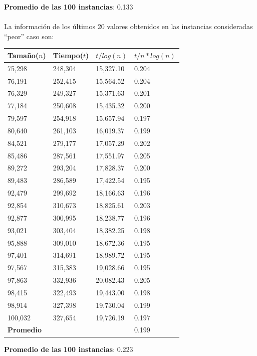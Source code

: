 \textbf{Promedio de las 100 instancias}: 0.133
\\
\\
La información de los últimos 20 valores obtenidos en las instancias consideradas ``peor'' caso son:

\begin{table}[H]
\parbox{0.3\textwidth}{
    \begin{tabular}{ | l | l |l | l |}
    \hline
	Tamaño($n$) & Tiempo($t$) & \textbf{$t / log(n)$} & \textbf{$t / n*log(n)$} \\ \hline
75,298	&	248,304	&	15,327.10	&	0.204	\\ \hline
76,191	&	252,415	&	15,564.52	&	0.204	\\ \hline
76,329	&	249,327	&	15,371.63	&	0.201	\\ \hline
77,184	&	250,608	&	15,435.32	&	0.200	\\ \hline
79,597	&	254,918	&	15,657.94	&	0.197	\\ \hline
80,640	&	261,103	&	16,019.37	&	0.199	\\ \hline
84,521	&	279,177	&	17,057.29	&	0.202	\\ \hline
85,486	&	287,561	&	17,551.97	&	0.205	\\ \hline
89,272	&	293,204	&	17,828.37	&	0.200	\\ \hline
89,483	&	286,589	&	17,422.54	&	0.195	\\ \hline
92,479	&	299,692	&	18,166.63	&	0.196	\\ \hline
92,854	&	310,673	&	18,825.61	&	0.203	\\ \hline
92,877	&	300,995	&	18,238.77	&	0.196	\\ \hline
93,021	&	303,404	&	18,382.25	&	0.198	\\ \hline
95,888	&	309,010	&	18,672.36	&	0.195	\\ \hline
97,401	&	314,691	&	18,989.72	&	0.195	\\ \hline
97,567	&	315,383	&	19,028.66	&	0.195	\\ \hline
97,863	&	332,936	&	20,082.43	&	0.205	\\ \hline
98,415	&	322,493	&	19,443.00	&	0.198	\\ \hline
98,914	&	327,398	&	19,730.04	&	0.199	\\ \hline
100,032	&	327,654	&	19,726.19	&	0.197	\\ \hline
    \textbf{Promedio} & & & 0.199 \\ \hline

    \end{tabular}
}
\end{table}

\textbf{Promedio de las 100 instancias}: 0.223
\\
\\





